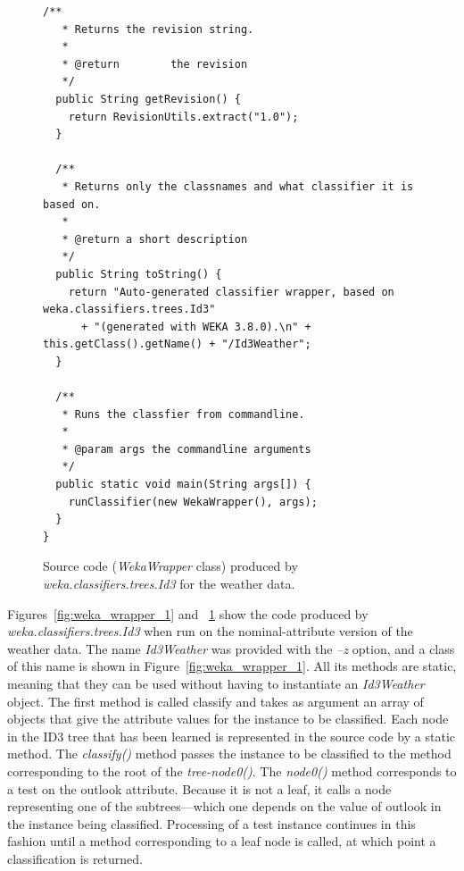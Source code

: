 \begin{figure}[!thp]
\ContinuedFloat
\begin{mdframed}[innermargin=-1cm]
\begin{Verbatim}[fontsize=\scriptsize]
/**
   * Returns the revision string.
   * 
   * @return        the revision
   */
  public String getRevision() {
    return RevisionUtils.extract("1.0");
  }

  /**
   * Returns only the classnames and what classifier it is based on.
   *
   * @return a short description
   */
  public String toString() {
    return "Auto-generated classifier wrapper, based on weka.classifiers.trees.Id3"
      + "(generated with WEKA 3.8.0).\n" + this.getClass().getName() + "/Id3Weather";
  }

  /**
   * Runs the classfier from commandline.
   *
   * @param args the commandline arguments
   */
  public static void main(String args[]) {
    runClassifier(new WekaWrapper(), args);
  }
}
\end{Verbatim}
\end{mdframed}
\caption{\label{fig:weka_wrapper_2}Source code (\textit{WekaWrapper} class) produced by \textit{weka.classifiers.trees.Id3} for the weather data.}
\end{figure}

Figures~\ref{fig:weka_wrapper_1} and ~\ref{fig:weka_wrapper_2} show
the code produced by \textit{weka.classifiers.trees.Id3} when run on the
nominal-attribute version of the weather data. The name \textit{Id3Weather} was
provided with the \textit{--z} option, and a class of this name is shown in
Figure~\ref{fig:weka_wrapper_1}. All its methods are static, meaning that they can be used
without having to instantiate an \textit{Id3Weather} object. The first method
is called classify and takes as argument an array of objects that give
the attribute values for the instance to be classified. Each node in
the ID3 tree that has been learned is represented in the source code
by a static method. The \textit{classify()} method passes the instance to be
classified to the method corresponding to the root of the
\textit{tree-node0()}. The \textit{node0()} method corresponds to a test on the outlook
attribute. Because it is not a leaf, it calls a node representing one
of the subtrees---which one depends on the value of outlook in the
instance being classified. Processing of a test instance continues in
this fashion until a method corresponding to a leaf node is called, at
which point a classification is returned.


